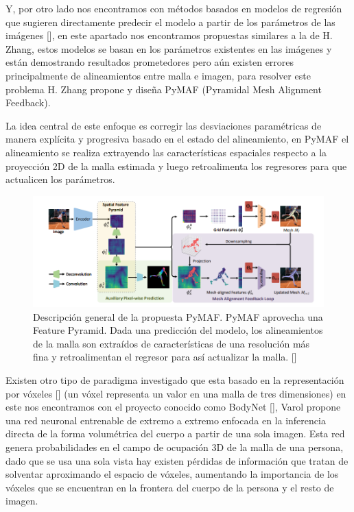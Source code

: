 Y, por otro lado nos encontramos con métodos basados en modelos de regresión que sugieren directamente predecir el modelo a partir de los parámetros de las imágenes [\cite{pymaf}], en este apartado nos encontramos propuestas similares a la de H. Zhang, estos modelos se basan en los parámetros existentes en las imágenes y están demostrando resultados prometedores pero aún existen errores principalmente de alineamientos entre malla e imagen, para resolver este problema H. Zhang  propone y diseña PyMAF (Pyramidal Mesh Alignment Feedback). 

La idea central de este enfoque es corregir las desviaciones paramétricas de manera explícita y progresiva basado en el estado del alineamiento, en PyMAF el alineamiento se realiza extrayendo las características espaciales respecto a la proyección 2D de la malla estimada y luego retroalimenta los regresores para que actualicen los parámetros.
\begin{figure}[H]
	\centering
	\includegraphics[scale=0.6]{imagenes/estadoarte3.png}
	\caption{ Descripción general de la propuesta PyMAF. PyMAF aprovecha una Feature Pyramid. Dada una predicción del modelo, los alineamientos de la malla son extraídos de características de una resolución más fina y retroalimentan el regresor para así actualizar la malla.  [\cite{pymaf}]   }
	\label{fig:figura4}
\end{figure}

Existen otro tipo de paradigma investigado que esta basado en la representación por vóxeles [\cite{Voxel}] (un vóxel representa un valor en una malla de tres dimensiones) en este nos encontramos con el proyecto conocido como BodyNet [\cite{bodynet}], Varol propone una red neuronal entrenable de extremo a extremo enfocada en la inferencia directa de la forma volumétrica del cuerpo a partir de una sola imagen. Esta red genera probabilidades en el campo de ocupación 3D de la malla de una persona, dado que se usa una sola vista hay existen pérdidas de información que tratan de solventar aproximando el espacio de vóxeles, aumentando la importancia de los vóxeles que se encuentran en la frontera del cuerpo de la persona y el resto de imagen.


